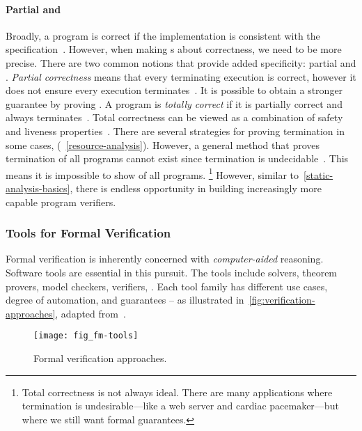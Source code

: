 \paragraph*{Partial and }
Broadly, a program is correct if the implementation is consistent with the
specification~\cite{furia2014b}. However, when making
s about correctness, we need to be more precise. There are two common
notions that provide added specificity: partial and
. \emph{Partial correctness}
means that every terminating execution is correct, however it does not ensure
every execution terminates~\cite[p. 64]{leino2023}. It is possible to obtain a
stronger guarantee by proving . A program is
\emph{totally correct} if it is partially correct and always terminates~\cite[p.
64]{leino2023}. Total correctness can be viewed as a
combination of safety and liveness
properties~\cite{lamport1977}. There are several
strategies for proving termination in some cases,
(\cf~\autoref{resource-analysis}). However, a general method that proves
termination of all programs cannot exist since termination is
undecidable~\cite{turing1936}. This means it is impossible
to show  of all programs. \footnote{Total
correctness is not always ideal. There are many
applications where termination is undesirable---like a web server and cardiac
pacemaker---but where we still want formal guarantees.} However, similar
to~\autoref{static-analysis-basics}, there is endless opportunity in building
increasingly more capable program verifiers.

\subsubsection{Tools for Formal Verification}

Formal verification is inherently concerned with
\emph{computer-aided} reasoning. Software tools are essential in this pursuit.
The tools include solvers, theorem provers, model checkers, verifiers, \etc.
Each tool family has different use cases, degree of automation, and guarantees
-- as illustrated in~\autoref{fig:verification-approaches}, adapted
from~\textcite{leroy2018}.

\begin{figure}[ht]
\centering
\texttt{[image: fig\_fm-tools]}
\caption[Formal verification approaches]{
Formal verification approaches.}
\label{fig:verification-approaches}
\end{figure}

